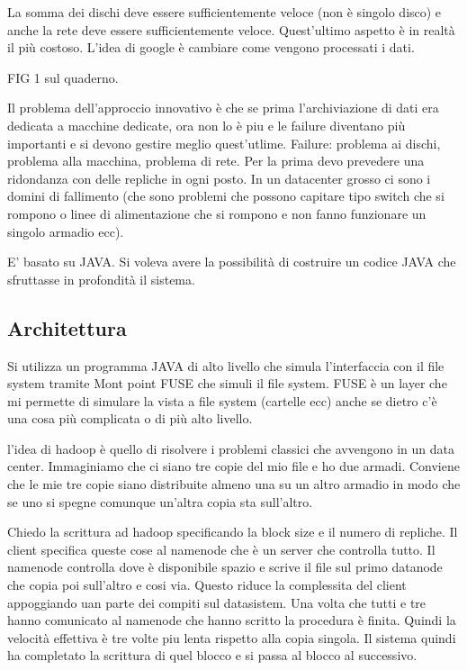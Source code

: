 \documentclass[italian,]{article}
\begin{document}
La somma dei dischi deve essere sufficientemente veloce (non è singolo
disco) e anche la rete deve essere sufficientemente veloce. Quest'ultimo
aspetto è in realtà il più costoso. L'idea di google è cambiare come
vengono processati i dati.

FIG 1 sul quaderno.

Il problema dell'approccio innovativo è che se prima l'archiviazione di
dati era dedicata a macchine dedicate, ora non lo è piu e le failure
diventano più importanti e si devono gestire meglio quest'utlime.
Failure: problema ai dischi, problema alla macchina, problema di rete.
Per la prima devo prevedere una ridondanza con delle repliche in ogni
posto. In un datacenter grosso ci sono i domini di fallimento (che sono
problemi che possono capitare tipo switch che si rompono o linee di
alimentazione che si rompono e non fanno funzionare un singolo armadio
ecc).

E' basato su JAVA. Si voleva avere la possibilità di costruire un codice
JAVA che sfruttasse in profondità il sistema. \subsection{Architettura}
Si utilizza un programma JAVA di alto livello che simula l'interfaccia
con il file system tramite Mont point FUSE che simuli il file system.
FUSE è un layer che mi permette di simulare la vista a file system
(cartelle ecc) anche se dietro c'è una cosa più complicata o di più alto
livello.

l'idea di hadoop è quello di risolvere i problemi classici che avvengono
in un data center. Immaginiamo che ci siano tre copie del mio file e ho
due armadi. Conviene che le mie tre copie siano distribuite almeno una
su un altro armadio in modo che se uno si spegne comunque un'altra copia
sta sull'altro.

Chiedo la scrittura ad hadoop specificando la block size e il numero di
repliche. Il client specifica queste cose al namenode che è un server
che controlla tutto. Il namenode controlla dove è disponibile spazio e
scrive il file sul primo datanode che copia poi sull'altro e cosi via.
Questo riduce la complessita del client appoggiando uan parte dei
compiti sul datasistem. Una volta che tutti e tre hanno comunicato al
namenode che hanno scritto la procedura è finita. Quindi la velocità
effettiva è tre volte piu lenta rispetto alla copia singola. Il sistema
quindi ha completato la scrittura di quel blocco e si passa al blocco al
successivo.
\end{document}
